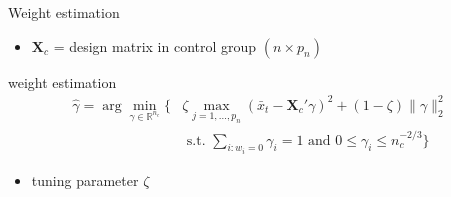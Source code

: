 \documentclass[xcolor=dvipsnames]{beamer}
\begin{document}
\begin{frame}{Weight estimation}
\begin{itemize}
  \item $\mathbf{X}_c$ = design matrix in control group $(n \times p_n)$
\end{itemize}
weight estimation
\begin{align*}
  \hat{\gamma} = \arg \min_{\gamma \in \mathbb{R}^{n_c}} 
  \Big\{ &
    \zeta \max_{j = 1, \dotsc, p_n} (\bar{x}_t - \mathbf{X}_c' \gamma)^2 + (1 - \zeta) \lVert  \gamma \rVert_2^2
  \\
    & \text{ s.t. } \sum_{i : w_i = 0} \gamma_i = 1 \text{ and } 0 \leq \gamma_i \leq n_c^{-2/3}
  \Big\}
\end{align*}
\begin{itemize}
  \item tuning parameter $\zeta$
\end{itemize}
\end{frame}

\appendix
\end{document}
